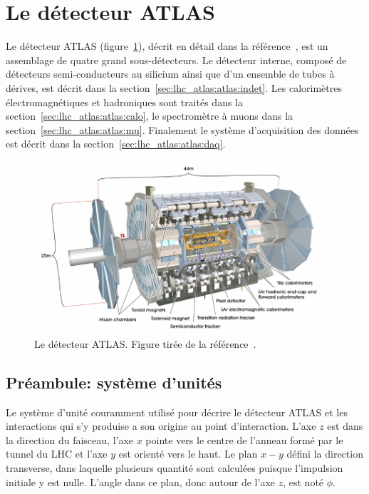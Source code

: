 \section{Le détecteur ATLAS}
\label{sec:lhc_atlas:atlas}

Le détecteur ATLAS (figure~\ref{fig:atlas}), décrit en détail dans la
référence~\cite{collaboration_atlas_2008}, est un assemblage de quatre
grand sous-détecteurs. Le détecteur interne, composé de détecteurs
semi-conducteurs au silicium ainsi que d'un ensemble de tubes à
dérives, est décrit dans la
section~\ref{sec:lhc_atlas:atlas:indet}. Les calorimètres
électromagnétiques et hadroniques sont traités dans la
section~\ref{sec:lhc_atlas:atlas:calo}, le spectromètre à muons dans
la section~\ref{sec:lhc_atlas:atlas:mu}. Finalement le système
d'acquisition des données est décrit dans la
section~\ref{sec:lhc_atlas:atlas:daq}.

\begin{figure}[h]
  \centering
  \includegraphics{atlas.pdf}
  \caption{Le détecteur ATLAS. Figure tirée de la référence~\cite{collaboration_atlas_2008}.}
  \label{fig:atlas}
\end{figure}

\subsection{Préambule: système d'unités}
\label{sec:units}

Le système d'unité couramment utilisé pour décrire le détecteur ATLAS
et les interactions qui s'y produise a son origine au point
d'interaction. L'axe $z$ est dans la direction du faisceau, l'axe $x$
pointe vers le centre de l'anneau formé par le tunnel du LHC et l'axe
$y$ est orienté vers le haut. Le plan $x-y$ défini la direction
transverse, dans laquelle plusieurs quantité sont calculées puisque
l'impulsion initiale y est nulle. L'angle dans ce plan, donc autour de
l'axe $z$, est noté $\phi$.

